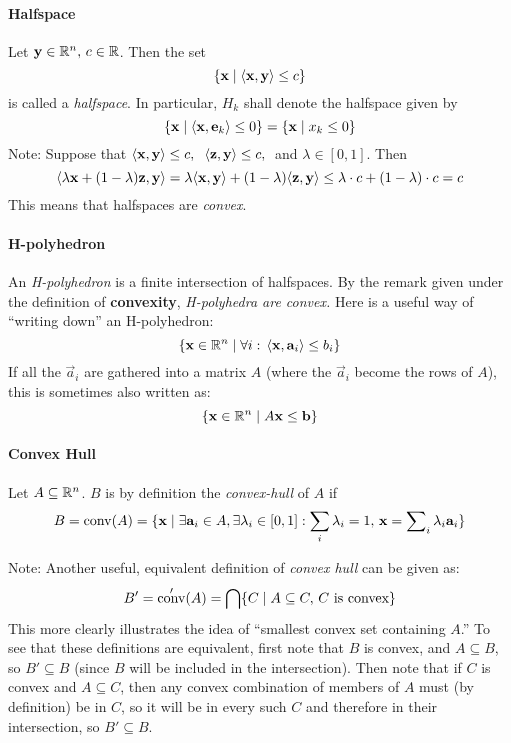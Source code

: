 \documentclass[a4,fleqn]{article}
\DeclareMathOperator{\conv}{conv}
\begin{document}
\paragraph{Halfspace}
Let $\mathbf{y} \in \mathbb{R}^n,\, c \in \mathbb{R}$.  Then the set
  \[ \{\mathbf{x} \;|\; \langle \mathbf{x}, \mathbf{y} \rangle \leq c\} \]
is called a \textit{halfspace}.  In particular, $H_k$ shall denote the halfspace given by
  \[ \{\mathbf{x} \;|\; \langle \mathbf{x}, \mathbf{e}_k \rangle \leq 0 \} = 
     \{\mathbf{x} \;|\; x_k \leq 0 \} \]
Note:  Suppose that 
  $\langle \mathbf{x}, \mathbf{y} \rangle \leq c,\;$ 
  $\langle \mathbf{z}, \mathbf{y} \rangle \leq c,\;$ and
  $\lambda \in [0,1]$.  Then
  \[ \langle \lambda \mathbf{x} + (1-\lambda) \mathbf{z}, \mathbf{y} \rangle = 
    \lambda \langle \mathbf{x}, \mathbf{y} \rangle + (1-\lambda) \langle \mathbf{z}, \mathbf{y} \rangle \leq \lambda \cdot c + (1-\lambda) \cdot c = c
  \]
  This means that halfspaces are \textit{convex}.

\paragraph{H-polyhedron}
An \textit{H-polyhedron} is a finite intersection of halfspaces.  By the remark given under the definition of \textbf{convexity}, \textit{H-polyhedra are convex.}  Here is a useful way of ``writing down'' an H-polyhedron:
  \[ \{ \mathbf{x} \in \mathbb{R}^n \;|\; 
    \forall i:\, \langle \mathbf{x}, \mathbf{a}_i \rangle \leq b_i \} \]
If all the $\vec{a}_i$ are gathered into a matrix $A$ (where the $\vec{a}_i$ become the rows of $A$), this is sometimes also written as:
  \[ \{ \mathbf{x} \in \mathbb{R}^n \;|\; A\mathbf{x} \leq \mathbf{b} \} \]

\paragraph{Convex Hull}
Let $A \subseteq \mathbb{R}^n$.  $B$ is by definition the \textit{convex-hull} of $A$ if
  \[ B = \conv(A) = \{ \vec{x} \suchthat \exists \vec{a}_i \in A, \exists\lambda_i \in [0,1]: \sum_i \lambda_i = 1,\,\vec{x} = \convCombb{\vec{a}}{\lambda}{i} \} \]

Note: Another useful, equivalent definition of \textit{convex hull} can be given as:
\[ B' = \conv'(A) = \bigcap \{C \suchthat 
      A \subseteq C, \, C \text{ is convex}\} \]
This more clearly illustrates the idea of ``smallest convex set containing $A$.''  To see that these definitions are equivalent, first note that $B$ is convex, and $A \subseteq B$, so $B' \subseteq B$ (since $B$ will be included in the intersection).  Then note that if $C$ is convex and $A \subseteq C$, then any convex combination of members of $A$ must (by definition) be in $C$, so it will be in every such $C$ and therefore in their intersection, so $B' \subseteq B.$
\end{document}

